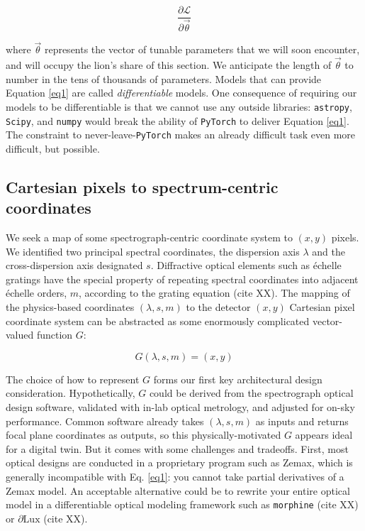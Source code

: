 \documentclass[twocolumn]{aastex63}
\begin{document}
\begin{equation}
  \frac{\partial{\mathcal{L}}}{\partial{\vec{\theta}}} \label{eq1}
\end{equation}

\noindent where $\vec{\theta}$ represents the vector of tunable parameters that we will soon encounter, and will occupy the lion's share of this section.  We anticipate the length of $\vec{\theta}$ to number in the tens of thousands of parameters.  Models that can provide Equation \ref{eq1} are called \emph{differentiable} models.  One consequence of requiring our models to be differentiable is that we cannot use any outside libraries: \texttt{astropy}, \texttt{Scipy}, and \texttt{numpy} would break the ability of \texttt{PyTorch} to deliver Equation \ref{eq1}.  The constraint to never-leave-\texttt{PyTorch} makes an already difficult task even more difficult, but possible.

\subsection{Cartesian pixels to spectrum-centric coordinates}
We seek a map of some spectrograph-centric coordinate system to $(x, y)$ pixels.  We identified two principal spectral coordinates, the dispersion axis $\lambda$ and the cross-dispersion axis designated $s$.  Diffractive optical elements such as \'echelle gratings have the special property of repeating spectral coordinates into adjacent \'echelle orders, $m$, according to the grating equation (cite XX).  The mapping of the physics-based coordinates $(\lambda, s, m)$ to the detector $(x, y)$ Cartesian pixel coordinate system can be abstracted as some enormously complicated vector-valued function $G$:

\begin{equation}
  G(\lambda, s, m) = (x,y)
\end{equation}

The choice of how to represent $G$ forms our first key architectural design consideration.  Hypothetically, $G$ could be derived from the spectrograph optical design software, validated with in-lab optical metrology, and adjusted for on-sky performance. Common software already takes $(\lambda, s, m)$ as inputs and returns focal plane coordinates as outputs, so this physically-motivated $G$ appears ideal for a digital twin. But it comes with some challenges and tradeoffs.  First, most optical designs are conducted in a proprietary program such as Zemax\texttrademark, which is generally incompatible with Eq. \ref{eq1}: you cannot take partial derivatives of a Zemax model.  An acceptable alternative could be to rewrite your entire optical model in a differentiable optical modeling framework such as \texttt{morphine} (cite XX) or $\partial{\mathrm{Lux}}$ (cite XX).
\end{document}
